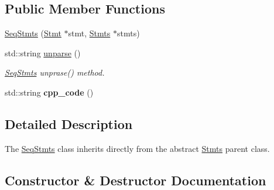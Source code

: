 \subsection*{Public Member Functions}
\begin{DoxyCompactItemize}
\item 
\hyperlink{classfcal_1_1ast_1_1SeqStmts_a622fd0334d78709b03f56f45bbbb550f}{Seq\+Stmts} (\hyperlink{classfcal_1_1ast_1_1Stmt}{Stmt} $\ast$stmt, \hyperlink{classfcal_1_1ast_1_1Stmts}{Stmts} $\ast$stmts)
\item 
std\+::string \hyperlink{classfcal_1_1ast_1_1SeqStmts_af4d437d57e334a6500ae7639d6eefbcc}{unparse} ()
\begin{DoxyCompactList}\small\item\em \hyperlink{classfcal_1_1ast_1_1SeqStmts}{Seq\+Stmts} unprase() method. \end{DoxyCompactList}\item 
std\+::string {\bfseries cpp\+\_\+code} ()\hypertarget{classfcal_1_1ast_1_1SeqStmts_ac4ff63dcef85497939c0193d5660f342}{}\label{classfcal_1_1ast_1_1SeqStmts_ac4ff63dcef85497939c0193d5660f342}

\end{DoxyCompactItemize}


\subsection{Detailed Description}
The \hyperlink{classfcal_1_1ast_1_1SeqStmts}{Seq\+Stmts} class inherits directly from the abstract \hyperlink{classfcal_1_1ast_1_1Stmts}{Stmts} parent class. 

\subsection{Constructor \& Destructor Documentation}
